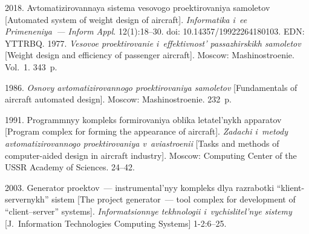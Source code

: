   \begin{multicols}{2}

\renewcommand{\bibname}{\protect\rmfamily References}

{\small\frenchspacing
 {%
 \begin{thebibliography}{9} 
      2018. Av\-to\-ma\-ti\-zi\-ro\-van\-naya 
sis\-te\-ma ve\-so\-vo\-go pro\-ek\-ti\-ro\-va\-niya sa\-mo\-le\-tov [Automated system of weight design of aircraft]. 
\textit{Informatika i~ee Primeneniya~--- Inform Appl}. 12(1):18--30. doi: 
10.14357/19922264180103. EDN: YTTRBQ.
      1977. \textit{Ve\-so\-voe pro\-ek\-ti\-ro\-va\-nie 
i~ef\-fek\-tiv\-nost' pas\-sa\-zhir\-skikh sa\-mo\-le\-tov} [Weight design and efficiency of passenger aircraft]. 
Moscow: Mashinostroenie. Vol.~1. 343~p.

      1986. \textit{Osnovy 
av\-to\-ma\-ti\-zi\-ro\-van\-no\-go pro\-ek\-ti\-ro\-va\-niya sa\-mo\-le\-tov} [Fundamentals of aircraft automated design]. 
Moscow: Mashinostroenie. 232~p.

      1991. Prog\-ram\-mnyy 
kom\-pleks for\-mi\-ro\-va\-niya ob\-li\-ka le\-ta\-tel'\-nykh ap\-pa\-ra\-tov [Program complex for forming the 
appearance of aircraft]. \textit{Zadachi i~metody avtomatizirovannogo proektirovaniya 
v~aviastroenii} [Tasks and methods of computer-aided design in aircraft industry]. Moscow: Computing Center of the
USSR Academy of Sciences. 24--42.

      2003. Ge\-ne\-ra\-tor pro\-ek\-tov~--- ins\-tru\-men\-tal'\-nyy komp\-leks dlya raz\-ra\-bot\-ki  
``klient-servernykh'' sis\-tem [The project generator~--- tool complex for development of  
``client--server'' systems]. \textit{In\-for\-ma\-tsi\-on\-nye tekh\-no\-lo\-gii i~vy\-chis\-li\-tel'\-nye sis\-te\-my} [J.~Information 
Technologies Computing Systems] 1-2:6--25.
      
     \end{thebibliography}

 }
 }

\end{multicols}

